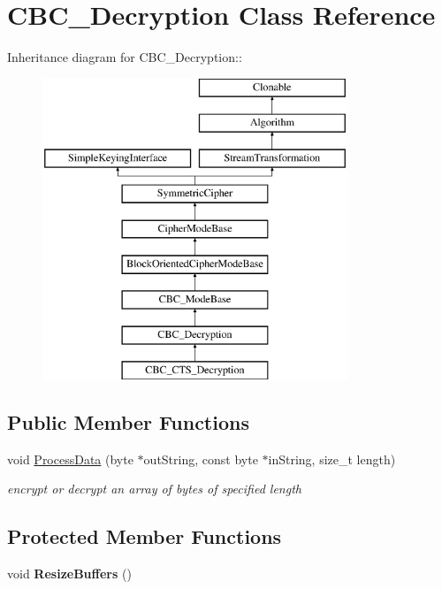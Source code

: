 \hypertarget{class_c_b_c___decryption}{
\section{CBC\_\-Decryption Class Reference}
\label{class_c_b_c___decryption}
}
Inheritance diagram for CBC\_\-Decryption::\begin{figure}[H]
\begin{center}
\leavevmode
\includegraphics[height=9cm]{class_c_b_c___decryption}
\end{center}
\end{figure}
\subsection*{Public Member Functions}
\begin{DoxyCompactItemize}
\item 
void \hyperlink{class_c_b_c___decryption_ad3dfde8d73d036dc144e8750a6a3b1d1}{ProcessData} (byte $\ast$outString, const byte $\ast$inString, size\_\-t length)
\begin{DoxyCompactList}\small\item\em encrypt or decrypt an array of bytes of specified length \item\end{DoxyCompactList}\end{DoxyCompactItemize}
\subsection*{Protected Member Functions}
\begin{DoxyCompactItemize}
\item 
\hypertarget{class_c_b_c___decryption_a90b463493ef297c3cae73b709b6980df}{
void {\bfseries ResizeBuffers} ()}
\label{class_c_b_c___decryption_a90b463493ef297c3cae73b709b6980df}

\end{DoxyCompactItemize}
